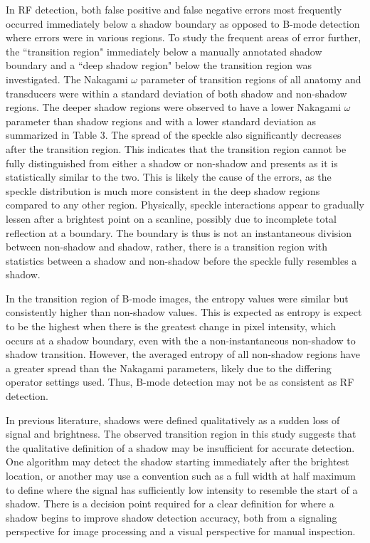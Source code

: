 \documentclass[preprint,5p,authoryear]{elsarticle}
\begin{document}
In RF detection, both false positive and false negative errors most frequently occurred immediately below a shadow boundary as opposed to B-mode detection where errors were in various regions. To study the frequent areas of error further, the ``transition region" immediately below a manually annotated shadow boundary and a ``deep shadow region" below the transition region was investigated. The Nakagami $\omega$ parameter of transition regions  of all anatomy and transducers were within a standard deviation of both shadow and non-shadow regions. The deeper shadow regions were observed to have a lower Nakagami $\omega$ parameter than shadow regions and with a lower standard deviation as summarized in Table 3. The spread of the speckle also significantly decreases after the transition region. This indicates that the transition region cannot be fully distinguished from either a shadow or non-shadow and presents as it is statistically similar to the two. This is likely the cause of the errors, as the speckle distribution is much more consistent in the deep shadow regions compared to any other region. Physically, speckle interactions appear to gradually lessen after a brightest point on a scanline, possibly due to incomplete total reflection at a boundary. The boundary is thus is not an instantaneous division between non-shadow and shadow, rather, there is a transition region with statistics between a shadow and non-shadow before the speckle fully resembles a shadow.

In the transition region of B-mode images, the entropy values were similar but consistently higher than non-shadow values. This is expected as entropy is expect to be the highest when there is the greatest change in pixel intensity, which occurs at a shadow boundary, even with the a non-instantaneous non-shadow to shadow transition. However, the averaged entropy of all non-shadow regions have a greater spread than the Nakagami parameters, likely due to the differing operator settings used. Thus, B-mode detection may not be as consistent as RF detection.

In previous literature, shadows were defined qualitatively \citep{Kremkau1986} as a sudden loss of signal and brightness. The observed transition region in this study suggests that the qualitative definition of a shadow may be insufficient for accurate detection. One algorithm may detect the shadow starting immediately after the brightest location, or another may use a convention such as a full width at half maximum to define where the signal has sufficiently low intensity to resemble the start of a shadow. There is a decision point required for a clear definition for where a shadow begins to improve shadow detection accuracy, both from a signaling perspective for image processing and a visual perspective for manual inspection. 
\end{document}
